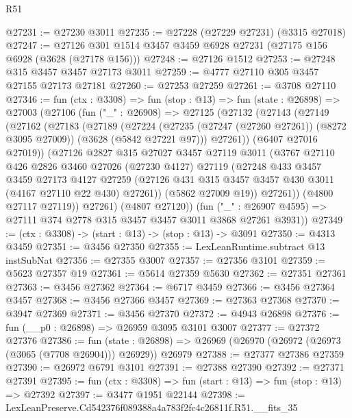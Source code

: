 \begin{lexlean}{R51}
\begin{coremodule}
@27231 := @27230 @3011
@27235 := @27228 (@27229 @27231) (@3315 @27018)
@27247 := @27126 @301 @1514 @3457 @3459 @6928 @27231 (@27175 @156 @6928 (@3628 (@27178 @156)))
@27248 := @27126 @1512
@27253 := @27248 @315 @3457 @3457 @27173 @3011
@27259 := @4777 @27110 @305 @3457 @27155 @27173 @27181
@27260 := @27253 @27259
@27261 := @3708 @27110
@27346 := fun (ctx : @3308) =>
  fun (stop : @13) =>
  fun (state : @26898) =>
  @27003
    (@27106
      (fun ("_" : @26908) =>
      @27125
        (@27132
          (@27143
            (@27149
              (@27162
                (@27183
                  (@27189
                    (@27224
                      (@27235 (@27247 (@27260 @27261)) (@8272 @3095 @27009))
                      (@3628 (@5842 @27221 @97)))
                    @27261))
                (@6407 @27016 @27019))
              (@27126
                @2827
                @315
                @27027
                @3457
                @27119
                @3011
                (@3767
                  @27110
                  @426
                  @2826
                  @3460
                  @27026
                  (@27230 @4127)
                  @27119
                  (@27248
                    @433
                    @3457
                    @3459
                    @27173
                    @4127
                    @27259
                    (@27126 @431 @315 @3457 @3457 @430 @3011 (@4167 @27110 @22 @430) @27261))
                  (@5862 @27009 @19))
                @27261))
            (@4800 @27117 @27119))
          @27261)
        (@4807 @27120))
      (fun ("_" : @26907 @4595) => @27111 @374 @2778 @315 @3457 @3457 @3011 @3868 @27261 @3931))
@27349 := (ctx : @3308) -> (start : @13) -> (stop : @13) -> @3091
@27350 := @4313 @3459
@27351 := @3456 @27350
@27355 := LexLeanRuntime.subtract @13 instSubNat
@27356 := @27355 @3007
@27357 := @27356 @3101
@27359 := @5623 @27357 @19
@27361 := @5614 @27359 @5630
@27362 := @27351 @27361
@27363 := @3456 @27362
@27364 := @6717 @3459
@27366 := @3456 @27364 @3457
@27368 := @3456 @27366 @3457
@27369 := @27363 @27368
@27370 := @3947 @27369
@27371 := @3456 @27370
@27372 := @4943 @26898
@27376 := fun (__p0 : @26898) => @26959 @3095 @3101 @3007
@27377 := @27372 @27376
@27386 := fun (state : @26898) =>
  @26969 (@26970 (@26972 (@26973 (@3065 (@7708 @26904))) @26929)) @26979
@27388 := @27377 @27386 @27359
@27390 := @26972 @6791 @3101
@27391 := @27388 @27390
@27392 := @27371 @27391
@27395 := fun (ctx : @3308) => fun (start : @13) => fun (stop : @13) => @27392
@27397 := @3477 @1951 @22144
@27398 := LexLeanPreserve.Cd542376f089388a4a783f2fc4c26811f.R51.__fits_35

\end{coremodule}
\end{lexlean}
